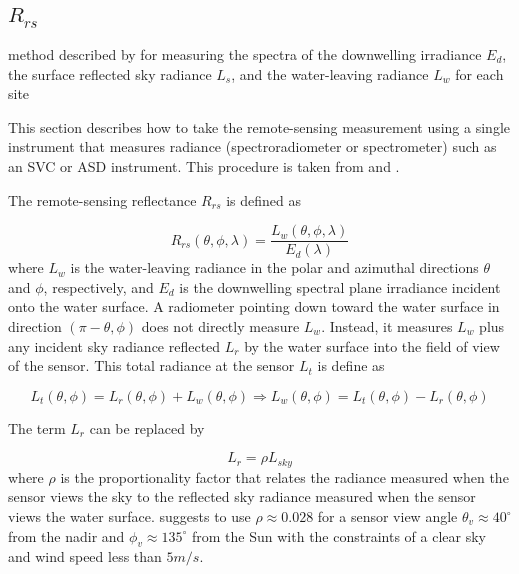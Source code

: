 \begin{appendices}
\section{\texorpdfstring{$R_{rs}$}{Rrs}}

method described by \cite{Mobley:1999} for measuring the spectra of the downwelling irradiance $E_d$, the surface reflected sky radiance $L_s$, and the water-leaving radiance $L_w$ for each site 

This section describes how to take the remote-sensing measurement using a single instrument that measures radiance (spectroradiometer or spectrometer) such as an SVC or ASD instrument. This procedure is taken from \cite{Mobley:1999} and \cite{Mueller1995}. 

The remote-sensing reflectance $R_{rs}$ is defined as

\begin{equation}\label{eq:Rrs}
	R_{rs}(\theta,\phi,\lambda)=\frac{L_w(\theta,\phi,\lambda)}{E_d(\lambda)}
\end{equation}
where $L_w$ is the water-leaving radiance in the polar and azimuthal directions $\theta$ and $\phi$, respectively, and $E_d$ is the downwelling spectral plane irradiance incident onto the water surface. A radiometer pointing down toward the water surface in direction $(\pi-\theta,\phi)$ does not directly measure $L_w$. Instead, it measures $L_w$  plus any incident sky radiance reflected $L_r$ by the water surface into the field of view of the sensor. This total radiance at the sensor $L_t$ is define as

\begin{equation}\label{eq:Lt}
	L_t(\theta,\phi) = L_r(\theta,\phi)+L_w(\theta,\phi)\Rightarrow L_w(\theta,\phi)=L_t(\theta,\phi) - L_r(\theta,\phi)
\end{equation}

The term $L_r$ can be replaced by

\begin{equation}\label{eq:Lsky}
	L_r = \rho L_{sky}
\end{equation}
where $\rho$ is the proportionality factor that relates the radiance measured when the sensor views the sky to the reflected sky radiance measured when the sensor views the water surface. \cite{Mobley:1999} suggests to use $\rho \approx 0.028$ for a sensor view angle $\theta_v \approx 40^\circ$ from the nadir and  $\phi_v \approx 135^\circ$ from the Sun with the constraints of a clear sky and wind speed less than $5m/s$.


\end{appendices}
